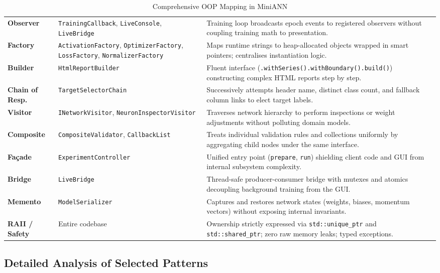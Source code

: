 \documentclass[11pt,a4paper]{article}
\begin{document}
\begin{table}[htbp]
\begin{tabularx}{\textwidth}{l p{4.5cm} X}
\addlinespace
\textbf{Observer} & \texttt{TrainingCallback}, \texttt{LiveConsole}, \texttt{LiveBridge} & Training loop broadcasts epoch events to registered observers without coupling training math to presentation. \\
\addlinespace
\textbf{Factory} & \texttt{ActivationFactory}, \texttt{OptimizerFactory}, \texttt{LossFactory}, \texttt{NormalizerFactory} & Maps runtime strings to heap-allocated objects wrapped in smart pointers; centralises instantiation logic. \\
\addlinespace
\textbf{Builder} & \texttt{HtmlReportBuilder} & Fluent interface (\texttt{.withSeries().withBoundary().build()}) constructing complex HTML reports step by step. \\
\addlinespace
\textbf{Chain of Resp.} & \texttt{TargetSelectorChain} & Successively attempts header name, distinct class count, and fallback column links to elect target labels. \\
\addlinespace
\textbf{Visitor} & \texttt{INetworkVisitor}, \texttt{NeuronInspectorVisitor} & Traverses network hierarchy to perform inspections or weight adjustments without polluting domain models. \\
\addlinespace
\textbf{Composite} & \texttt{CompositeValidator}, \texttt{CallbackList} & Treats individual validation rules and collections uniformly by aggregating child nodes under the same interface. \\
\addlinespace
\textbf{Fa\c{c}ade} & \texttt{ExperimentController} & Unified entry point (\texttt{prepare}, \texttt{run}) shielding client code and GUI from internal subsystem complexity. \\
\addlinespace
\textbf{Bridge} & \texttt{LiveBridge} & Thread-safe producer-consumer bridge with mutexes and atomics decoupling background training from the GUI. \\
\addlinespace
\textbf{Memento} & \texttt{ModelSerializer} & Captures and restores network states (weights, biases, momentum vectors) without exposing internal invariants. \\
\addlinespace
\textbf{RAII / Safety} & Entire codebase & Ownership strictly expressed via \texttt{std::unique\_ptr} and \texttt{std::shared\_ptr}; zero raw memory leaks; typed exceptions. \\
\bottomrule
\end{tabularx}
\caption{Comprehensive OOP Mapping in MiniANN}
\end{table}

\subsection{Detailed Analysis of Selected Patterns}
\end{document}
